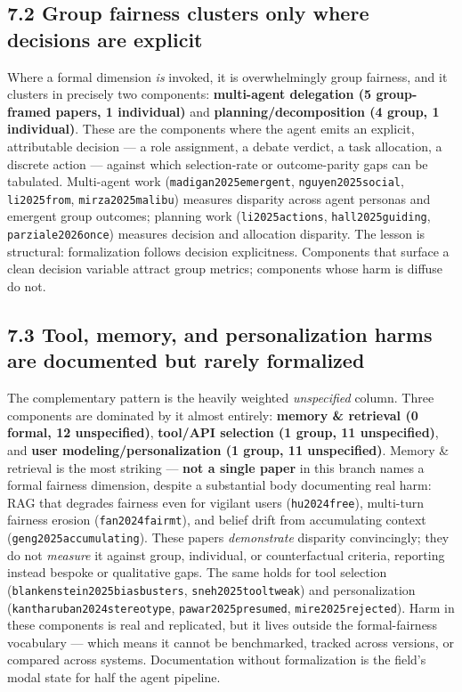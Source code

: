 \documentclass[sigconf,nonacm]{acmart}
\begin{document}
\subsection{7.2 Group fairness clusters only where decisions are explicit}

Where a formal dimension \emph{is} invoked, it is overwhelmingly group fairness, and it clusters in precisely two components: \textbf{multi-agent delegation (5 group-framed papers, 1 individual)} and \textbf{planning/decomposition (4 group, 1 individual)}. These are the components where the agent emits an explicit, attributable decision — a role assignment, a debate verdict, a task allocation, a discrete action — against which selection-rate or outcome-parity gaps can be tabulated. Multi-agent work (\texttt{madigan2025emergent}, \texttt{nguyen2025social}, \texttt{li2025from}, \texttt{mirza2025malibu}) measures disparity across agent personas and emergent group outcomes; planning work (\texttt{li2025actions}, \texttt{hall2025guiding}, \texttt{parziale2026once}) measures decision and allocation disparity. The lesson is structural: formalization follows decision explicitness. Components that surface a clean decision variable attract group metrics; components whose harm is diffuse do not.

\subsection{7.3 Tool, memory, and personalization harms are documented but rarely formalized}

The complementary pattern is the heavily weighted \emph{unspecified} column. Three components are dominated by it almost entirely: \textbf{memory \& retrieval (0 formal, 12 unspecified)}, \textbf{tool/API selection (1 group, 11 unspecified)}, and \textbf{user modeling/personalization (1 group, 11 unspecified)}. Memory \& retrieval is the most striking — \textbf{not a single paper} in this branch names a formal fairness dimension, despite a substantial body documenting real harm: RAG that degrades fairness even for vigilant users (\texttt{hu2024free}), multi-turn fairness erosion (\texttt{fan2024fairmt}), and belief drift from accumulating context (\texttt{geng2025accumulating}). These papers \emph{demonstrate} disparity convincingly; they do not \emph{measure} it against group, individual, or counterfactual criteria, reporting instead bespoke or qualitative gaps. The same holds for tool selection (\texttt{blankenstein2025biasbusters}, \texttt{sneh2025tooltweak}) and personalization (\texttt{kantharuban2024stereotype}, \texttt{pawar2025presumed}, \texttt{mire2025rejected}). Harm in these components is real and replicated, but it lives outside the formal-fairness vocabulary — which means it cannot be benchmarked, tracked across versions, or compared across systems. Documentation without formalization is the field's modal state for half the agent pipeline.
\end{document}
